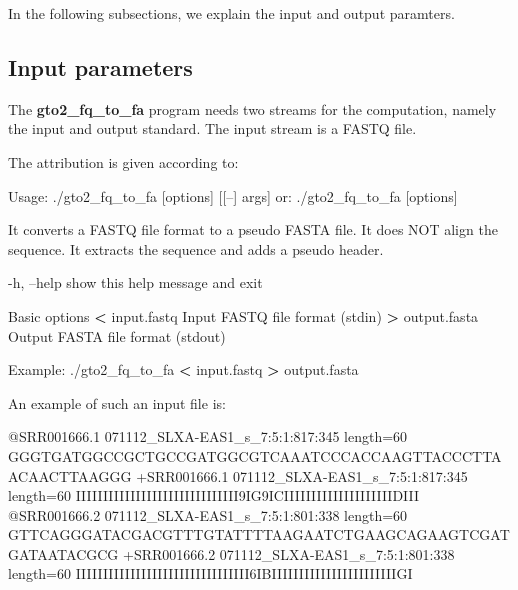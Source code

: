 \documentclass[11pt,]{krantz}
\newenvironment{Shaded}{\begin{snugshade}}{\end{snugshade}}
\newcommand{\OperatorTok}[1]{\textcolor[rgb]{0.43,0.43,0.43}{\textbf{#1}}}
\newcommand{\ExtensionTok}[1]{#1}
\newcommand{\NormalTok}[1]{#1}
\begin{document}
In the following subsections, we explain the input and output paramters.

\subsection*{Input parameters}\label{input-parameters}


The \textbf{gto2\_fq\_to\_fa} program needs two streams for the
computation, namely the input and output standard. The input stream is a
FASTQ file.

The attribution is given according to:

\begin{Shaded}
\begin{Highlighting}[]
\ExtensionTok{Usage}\NormalTok{: ./gto2_fq_to_fa [options] [[--] args]}
   \ExtensionTok{or}\NormalTok{: ./gto2_fq_to_fa [options]}

\ExtensionTok{It}\NormalTok{ converts a FASTQ file format to a pseudo FASTA file.}
\ExtensionTok{It}\NormalTok{ does NOT align the sequence.}
\ExtensionTok{It}\NormalTok{ extracts the sequence and adds a pseudo header.}

    \ExtensionTok{-h}\NormalTok{, --help            show this help message and exit}

\ExtensionTok{Basic}\NormalTok{ options}
    \OperatorTok{<} \ExtensionTok{input.fastq}\NormalTok{         Input FASTQ file format (stdin)}
    \OperatorTok{>} \ExtensionTok{output.fasta}\NormalTok{        Output FASTA file format (stdout)}

\ExtensionTok{Example}\NormalTok{: ./gto2_fq_to_fa }\OperatorTok{<}\NormalTok{ input.fastq }\OperatorTok{>}\NormalTok{ output.fasta}
\end{Highlighting}
\end{Shaded}

An example of such an input file is:

\begin{Shaded}
\begin{Highlighting}[]
\ExtensionTok{@SRR001666.1}\NormalTok{ 071112_SLXA-EAS1_s_7:5:1:817:345 length=60}
\ExtensionTok{GGGTGATGGCCGCTGCCGATGGCGTCAAATCCCACCAAGTTACCCTTAACAACTTAAGGG}
\ExtensionTok{+SRR001666.1}\NormalTok{ 071112_SLXA-EAS1_s_7:5:1:817:345 length=60}
\ExtensionTok{IIIIIIIIIIIIIIIIIIIIIIIIIIIIII9IG9ICIIIIIIIIIIIIIIIIIIIIDIII}
\ExtensionTok{@SRR001666.2}\NormalTok{ 071112_SLXA-EAS1_s_7:5:1:801:338 length=60}
\ExtensionTok{GTTCAGGGATACGACGTTTGTATTTTAAGAATCTGAAGCAGAAGTCGATGATAATACGCG}
\ExtensionTok{+SRR001666.2}\NormalTok{ 071112_SLXA-EAS1_s_7:5:1:801:338 length=60}
\ExtensionTok{IIIIIIIIIIIIIIIIIIIIIIIIIIIIIIII6IBIIIIIIIIIIIIIIIIIIIIIIIGI}
\end{Highlighting}
\end{Shaded}
\end{document}
